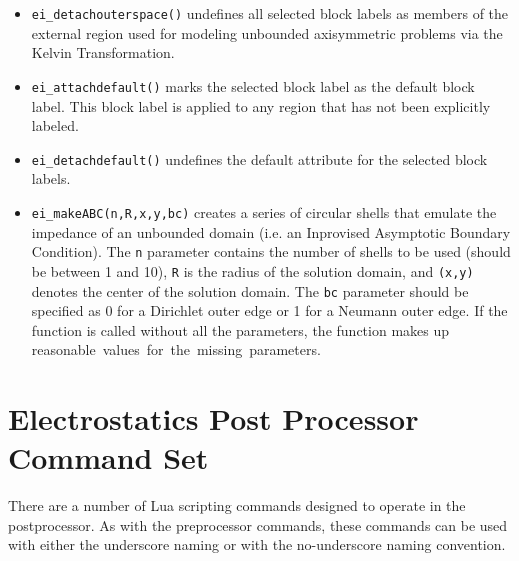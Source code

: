\begin{itemize}
\item{\tt ei\_detachouterspace()} undefines all selected block labels
as members of the external region used for modeling unbounded axisymmetric
problems via the Kelvin Transformation.

\item{\tt ei\_attachdefault()} marks the
selected block label as the default block label.  This block label
is applied to any region that has not been explicitly labeled.

\item{\tt ei\_detachdefault()} undefines the default
attribute for the selected block labels.

\item{\tt ei\_makeABC(n,R,x,y,bc)} creates a series of circular shells that emulate the
impedance of an unbounded domain (i.e. an Inprovised Asymptotic Boundary
Condition).  The {\tt n} parameter contains the number of shells to be used
(should be between 1 and 10), {\tt R} is the radius of the solution domain, and
{\tt (x,y)} denotes the center of the solution domain.  The {\tt bc} parameter should
be specified as 0 for a Dirichlet outer edge or 1 for a Neumann outer edge.
If the function is called without all the parameters, the function makes up
reasonable values for the missing parameters.

\end{itemize}

\section{Electrostatics Post Processor Command Set}

There are a number of Lua scripting commands designed to operate in
the postprocessor. As with the preprocessor commands, these
commands can be used with either the underscore naming or with the
no-underscore naming convention.

